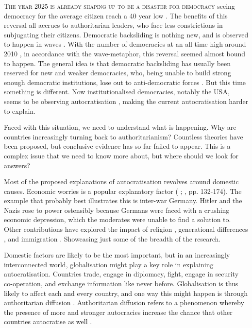 \lettrine{T}{he year 2025 is already shaping up to be a disaster for democracy} seeing democracy for the average citizen reach a 40 year low \citep[p. 9]{nord_democracy_2025}. The benefits of this reversal all accrues to authoritarian leaders, who face less constrictions in subjugating their citizens. Democratic backsliding is nothing new, and is observed to happen in waves \citep{huntington_third_1991}. With the number of democracies at an all time high around 2010 \citep[pp. 10-11]{nord_democracy_2025}, in accordance with the wave-metaphor, this reversal seemed almost bound to happen. The general idea is that democratic backsliding has usually been reserved for new and weaker democracies, who, being unable to build strong enough democratic institutions, lose out to anti-democratic forces \citep{huntington_third_1991}. But this time something is different. Now institutionalised democracies, notably the USA, seems to be observing autocratisation \citep{nord_democracy_2025}, making the current autocratisation harder to explain.

Faced with this situation, we need to understand what is happening. Why are countries increasingly turning back to authoritarianism? Countless theories have been proposed, but conclusive evidence has so far failed to appear. This is a complex issue that we need to know more about, but where should we look for answers? 

Most of the proposed explanations of autocratisation revolves around domestic causes. Economic worries is a popular explanatory factor (\citeauthor{lipset_chapter_1960} \citeyear{lipset_chapter_1960}; \citeauthor{norris_cultural_2019} \citeyear{norris_cultural_2019}, pp. 132-174). The example that probably best illustrates this is inter-war Germany. Hitler and the Nazis rose to power ostensibly because Germans were faced with a crushing economic depression, which the moderates were unable to find a solution to. Other contributions have explored the impact of religion \citep{huntington_third_1991}, generational differences \citep{norris_cultural_2019}, and immigration \citep[pp. 175-212]{norris_cultural_2019}. Showcasing just some of the breadth of the research. 

Domestic factors are likely to be the most important, but in an increasingly interconnected world, globalisation might play a key role in explaining autocratisation. Countries trade, engage in diplomacy, fight, engage in security co-operation, and exchange information like never before. Globalisation is thus likely to affect each and every country, and one way this might happen is through authoritarian diffusion \citep{ambrosio_constructing_2010}. Authoritarian diffusion refers to a phenomenon whereby the presence of more and stronger autocracies increase the chance that other countries autocratise as well \citep{ambrosio_constructing_2010}. 

